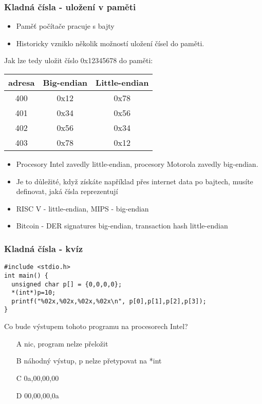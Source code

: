 \documentclass{beamer}
\begin{document}
\begin{frame}
\frametitle{Kladná čísla - uložení v paměti}

\begin{itemize}
\item Paměť počítače pracuje s bajty
\item Historicky vzniklo několik možností uložení čísel do paměti.
\end{itemize}

Jak lze tedy uložit číslo 0x12345678 do paměti:
\begin{tabular}{|c|c|c|}\hline
adresa & Big-endian & Little-endian \\ \hline
400 & 0x12 & 0x78 \\ \hline
401 & 0x34 & 0x56 \\ \hline
402 & 0x56 & 0x34 \\ \hline
403 & 0x78 & 0x12 \\ \hline
\end{tabular}

\begin{itemize}
\item Procesory Intel zavedly little-endian, procesory Motorola zavedly big-endian.
\item Je to důležité, když získáte například přes internet data po bajtech, musíte definovat, jaká čísla reprezentují
\item RISC V - little-endian, MIPS - big-endian
\item Bitcoin - DER signatures big-endian, transaction hash little-endian
\end{itemize}
\end{frame}

\begin{frame}[fragile]
\frametitle{Kladná čísla - kvíz}
\begin{verbatim}
#include <stdio.h>
int main() {
  unsigned char p[] = {0,0,0,0};
  *(int*)p=10;
  printf("%02x,%02x,%02x,%02x\n", p[0],p[1],p[2],p[3]);
}
\end{verbatim}

Co bude výstupem tohoto programu na procesorech Intel?
\begin{itemize}
\item[A] nic, program nelze přeložit
\item[B] náhodný výstup, p  nelze přetypovat na *int
\item[C] 0a,00,00,00 
\item[D] 00,00,00,0a
\end{itemize}
\end{frame}
\end{document}
